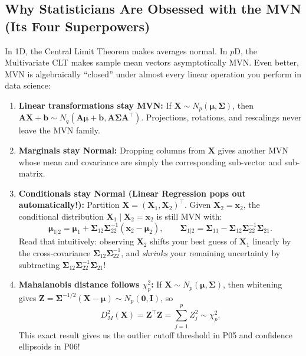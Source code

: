 \documentclass[11pt, a4paper]{article}
\begin{document}
\subsection{Why Statisticians Are Obsessed with the MVN (Its Four Superpowers)}
In 1D, the Central Limit Theorem makes averages normal. In $p$D, the Multivariate CLT makes sample mean vectors asymptotically MVN. Even better, MVN is algebraically ``closed'' under almost every linear operation you perform in data science:
\begin{enumerate}
    \item \textbf{Linear transformations stay MVN:} If $\mathbf{X} \sim N_p(\boldsymbol{\mu}, \boldsymbol{\Sigma})$, then $\mathbf{A}\mathbf{X} + \mathbf{b} \sim N_q(\mathbf{A}\boldsymbol{\mu} + \mathbf{b}, \mathbf{A}\boldsymbol{\Sigma}\mathbf{A}^\top)$. Projections, rotations, and rescalings never leave the MVN family.
    \item \textbf{Marginals stay Normal:} Dropping columns from $\mathbf{X}$ gives another MVN whose mean and covariance are simply the corresponding sub-vector and sub-matrix.
    \item \textbf{Conditionals stay Normal (Linear Regression pops out automatically!):} Partition $\mathbf{X} = (\mathbf{X}_1, \mathbf{X}_2)^\top$. Given $\mathbf{X}_2 = \mathbf{x}_2$, the conditional distribution $\mathbf{X}_1 \mid \mathbf{X}_2 = \mathbf{x}_2$ is still MVN with:
    \[
        \boldsymbol{\mu}_{1|2} = \boldsymbol{\mu}_1 + \boldsymbol{\Sigma}_{12}\boldsymbol{\Sigma}_{22}^{-1}(\mathbf{x}_2 - \boldsymbol{\mu}_2),
        \qquad
        \boldsymbol{\Sigma}_{1|2} = \boldsymbol{\Sigma}_{11} - \boldsymbol{\Sigma}_{12}\boldsymbol{\Sigma}_{22}^{-1}\boldsymbol{\Sigma}_{21}.
    \]
    Read that intuitively: observing $\mathbf{X}_2$ shifts your best guess of $\mathbf{X}_1$ linearly by the cross-covariance $\boldsymbol{\Sigma}_{12}\boldsymbol{\Sigma}_{22}^{-1}$, and \emph{shrinks} your remaining uncertainty by subtracting $\boldsymbol{\Sigma}_{12}\boldsymbol{\Sigma}_{22}^{-1}\boldsymbol{\Sigma}_{21}$!
    \item \textbf{Mahalanobis distance follows $\chi_p^2$:} If $\mathbf{X} \sim N_p(\boldsymbol{\mu}, \boldsymbol{\Sigma})$, then whitening gives $\mathbf{Z} = \boldsymbol{\Sigma}^{-1/2}(\mathbf{X}-\boldsymbol{\mu}) \sim N_p(\mathbf{0}, \mathbf{I})$, so
    \[
        D_M^2(\mathbf{X}) = \mathbf{Z}^\top \mathbf{Z} = \sum_{j=1}^p Z_j^2 \sim \chi_p^2.
    \]
    This exact result gives us the outlier cutoff threshold in P05 and confidence ellipsoids in P06!
\end{enumerate}
\end{document}
